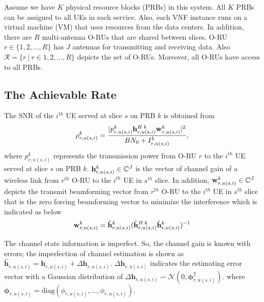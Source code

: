 \documentclass[lettersize,journal]{IEEEtran}
\begin{document}
Assume we have $K$ physical resource blocks (PRBs) in this system.
All $K$ PRBs can be assigned to all UEs in each service.
Also, each VNF instance runs on a virtual machine (VM) that uses resources from the data centers.
In addition, there are $R$ multi-antenna O-RUs that are shared between slices. O-RU $r \in \{1,2,...,R \}$ has $J$ antennas for transmitting and receiving data. Also $\mathcal{R} = \{ r \ | \ r\in 1,2,...,R \}$ depicts the set of O-RUs. Moreover, all O-RUs have access to all PRBs.

\subsection{The Achievable Rate}
The SNR of the $i^{th}$ UE served at slice $s$ on PRB $k$ is obtained from
\begin{equation}\label{eq1}
\rho_{r,u(s,i)}^{k} =  \frac{|p_{r,u(s,i)}^{k}{\bold{h}_{r,u(s,i)}^{H \: k}} \bold{w}_{r,u(s,i)}^{k}|^2}{BN_0 + I_{r,u(s,i)}^{k}},
\end{equation} 
where $p_{r,u(s,i)}^{k}$ represents the transmission power from O-RU $r$ to the $i^{th}$ UE served at slice $s$ on PRB $k$. 
${\bold{h}_{r,u(s,i)}^{k}} \in \mathbb{C}^{J}$ is the vector of channel gain of a wireless link from 
$r^{th}$ O-RU to the $i^{th}$ UE in $s^{th}$ slice. In addition, $\bold{w}_{r,u(s,i)}^{k} \in \mathbb{C}^{J}$ depicts the  transmit beamforming vector from $r^{th}$ O-RU to the $i^{th}$ UE in $s^{th}$ slice that is the zero forcing beamforming vector to minimize the interference which is indicated as below
\begin{equation}
\bold{w}_{r,u(s,i)}^{k} = \hat{\bold{h}}_{r,u(s,i)}^{k}(\hat{\bold{h}}_{r,u(s,i)}^{H \: k} \hat{\bold{h}}_{r,u(s,i)}^{k})^{-1}
\end{equation}

The channel state information is imperfect. So, the channel gain is known with errors; the imperfection of channel estimation is shown as
$\hat{\boldsymbol{h}}_{r,u(s,i)} = \boldsymbol{h}_{r,u(s,i)} + \Delta \boldsymbol{h}_{r,u(s,i)}$.
$\Delta \boldsymbol{h}_{r,u(s,i)}$ indicates the estimating error vector with a Gaussian distribution of
$\Delta \boldsymbol{h}_{r,u(s,i)}\backsim \mathcal{N}(0,\boldsymbol{\phi}_{r,u(s,i)}^2)$.
where $\boldsymbol{\phi}_{r,u(s,i)} = \text{diag}(\phi_{r,u(s,i)},\ldots,\phi_{r,u(s,i)}).$
\end{document}
